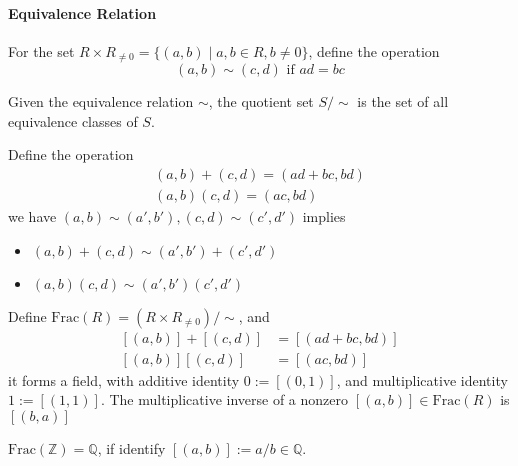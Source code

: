 \paragraph{Equivalence Relation}
For the set $R\times R_{\ne0}=\{(a,b)\mid a,b\in R,b\ne0\}$, define the operation
\[
(a,b)\sim (c,d)\mbox{ if }ad=bc
\]

\begin{definition}
Given the equivalence relation $\sim$, the quotient set $S/\sim$ is the set of all equivalence classes of $S$.
\end{definition}
Define the operation
\[
\begin{array}{l}
(a,b)+(c,d)=(ad+bc,bd)\\
(a,b)(c,d)=(ac,bd)
\end{array}
\]
we have $(a,b)\sim(a',b'), (c,d)\sim(c',d')$ implies
\begin{itemize}
\item
$(a,b)+(c,d)\sim(a',b')+(c',d')$
\item
$(a,b)(c,d)\sim(a',b')(c',d')$
\end{itemize}
\begin{definition}
Define $\mbox{Frac}(R)=(R\times R_{\ne0})/\sim$, and 
\[
\begin{aligned}
[(a,b)]+[(c,d)]&=[(ad+bc,bd)]\\
[(a,b)][(c,d)]&=[(ac,bd)]
\end{aligned}
\]
it forms a field, with additive identity $0:=[(0,1)]$, and multiplicative identity $1:=[(1,1)]$. The multiplicative inverse of a nonzero $[(a,b)]\in\mbox{Frac}(R)$ is $[(b,a)]$
\end{definition}
\begin{remark}
$\mbox{Frac}(\mathbb{Z})=\mathbb{Q}$, if identify $[(a,b)]:=a/b\in\mathbb{Q}$.
\end{remark}
